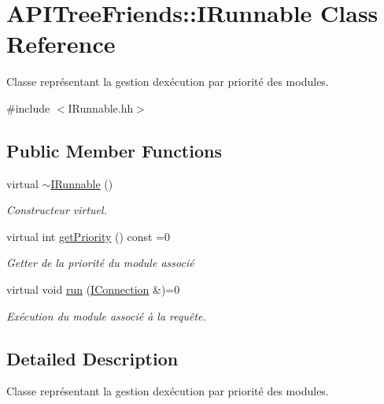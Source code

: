 \hypertarget{class_a_p_i_tree_friends_1_1_i_runnable}{}\section{A\+P\+I\+Tree\+Friends\+:\+:I\+Runnable Class Reference}
\label{class_a_p_i_tree_friends_1_1_i_runnable}


Classe représentant la gestion d\textquotesingle{}exécution par priorité des modules.  




{\ttfamily \#include $<$I\+Runnable.\+hh$>$}

\subsection*{Public Member Functions}
\begin{DoxyCompactItemize}
\item 
\hypertarget{class_a_p_i_tree_friends_1_1_i_runnable_a7eceec6f7111a22eff546bca302b7847}{}virtual \hyperlink{class_a_p_i_tree_friends_1_1_i_runnable_a7eceec6f7111a22eff546bca302b7847}{$\sim$\+I\+Runnable} ()\label{class_a_p_i_tree_friends_1_1_i_runnable_a7eceec6f7111a22eff546bca302b7847}

\begin{DoxyCompactList}\small\item\em Constructeur virtuel. \end{DoxyCompactList}\item 
virtual int \hyperlink{class_a_p_i_tree_friends_1_1_i_runnable_aeb9109b9073b2514f22ff0d8feac144b}{get\+Priority} () const =0
\begin{DoxyCompactList}\small\item\em Getter de la priorité du module associé \end{DoxyCompactList}\item 
virtual void \hyperlink{class_a_p_i_tree_friends_1_1_i_runnable_a2a8f99d07563ad7a66f30df4fb996f82}{run} (\hyperlink{class_a_p_i_tree_friends_1_1_i_connection}{I\+Connection} \&)=0
\begin{DoxyCompactList}\small\item\em Exécution du module associé à la requête. \end{DoxyCompactList}\end{DoxyCompactItemize}


\subsection{Detailed Description}
Classe représentant la gestion d\textquotesingle{}exécution par priorité des modules. 

